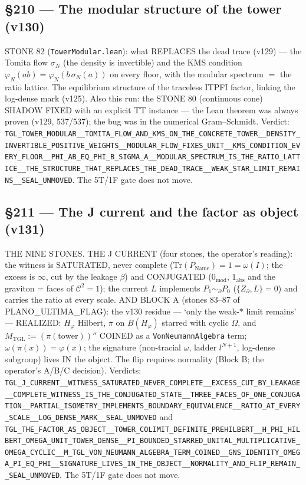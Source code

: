 \documentclass[11pt]{article}
\theoremstyle{definition}\newtheorem{deriv}{Derivation}
\begin{document}
\subsection*{\S210 --- The modular structure of the tower (v130)}STONE 82 (\texttt{TowerModular.lean}): what REPLACES the dead trace (v129) --- the Tomita flow $\sigma_N$ (the density is invertible) and the KMS condition $\varphi_N(ab)=\varphi_N(b\,\sigma_N(a))$ on every floor, with the modular spectrum $=$ the ratio lattice. The equilibrium structure of the traceless ITPFI factor, linking the log-dense mark (v125). Also this run: the STONE 80 (continuous cone) SHADOW FIXED with an explicit TT instance --- the Lean theorem was always proven (v129, 537/537); the bug was in the numerical Gram--Schmidt. Verdict: \texttt{TGL\_TOWER\_MODULAR\_\_TOMITA\_FLOW\_AND\_KMS\_ON\_THE\_CONCRETE\_TOWER\_\_DENSITY\_INVERTIBLE\_POSITIVE\_WEIGHTS\_\_MODULAR\_FLOW\_FIXES\_UNIT\_\_KMS\_CONDITION\_EVERY\_FLOOR\_\_PHI\_AB\_EQ\_PHI\_B\_SIGMA\_A\_\_MODULAR\_SPECTRUM\_IS\_THE\_RATIO\_LATTICE\_\_THE\_STRUCTURE\_THAT\_REPLACES\_THE\_DEAD\_TRACE\_\_WEAK\_STAR\_LIMIT\_REMAINS\_\_SEAL\_UNMOVED}. The 5T/1F gate does not move.

\subsection*{\S211 --- The J current and the factor as object (v131)}THE NINE STONES. THE J CURRENT (four stones, the operator's reading): the witness is SATURATED, never complete ($\mathrm{Tr}(P_{\mathrm{Name}})=1=\omega(I)$; the excess is $\infty$, cut by the leakage $\beta$) and CONJUGATED ($0_{\mathrm{mod}}$, $1_{\mathrm{abs}}$ and the graviton = faces of $\mathcal{C}^2=1$); the current $L$ implements $P_1\sim_\partial P_0$ ($\{Z_\partial,L\}=0$) and carries the ratio at every scale. AND BLOCK A (stones 83--87 of PLANO\_ULTIMA\_FLAG): the v130 residue --- ‘only the weak-$*$ limit remains’ --- REALIZED: $H_\varphi$ Hilbert, $\pi$ on $B(H_\varphi)$ starred with cyclic $\Omega$, and $M_{\mathrm{TGL}}:=(\pi(\mathrm{tower}))''$ COINED as a \texttt{VonNeumannAlgebra} term; $\omega(\pi(x))=\varphi(x)$; the signature (non-tracial $\omega$, ladder $l^{N+1}$, log-dense subgroup) lives IN the object. The flip requires normality (Block B; the operator's A/B/C decision). Verdicts: \texttt{TGL\_J\_CURRENT\_\_WITNESS\_SATURATED\_NEVER\_COMPLETE\_\_EXCESS\_CUT\_BY\_LEAKAGE\_\_COMPLETE\_WITNESS\_IS\_THE\_CONJUGATED\_STATE\_\_THREE\_FACES\_OF\_ONE\_CONJUGATION\_\_PARTIAL\_ISOMETRY\_IMPLEMENTS\_BOUNDARY\_EQUIVALENCE\_\_RATIO\_AT\_EVERY\_SCALE\_\_LOG\_DENSE\_MARK\_\_SEAL\_UNMOVED} and \texttt{TGL\_THE\_FACTOR\_AS\_OBJECT\_\_TOWER\_COLIMIT\_DEFINITE\_PREHILBERT\_\_H\_PHI\_HILBERT\_OMEGA\_UNIT\_TOWER\_DENSE\_\_PI\_BOUNDED\_STARRED\_UNITAL\_MULTIPLICATIVE\_OMEGA\_CYCLIC\_\_M\_TGL\_VON\_NEUMANN\_ALGEBRA\_TERM\_COINED\_\_GNS\_IDENTITY\_OMEGA\_PI\_EQ\_PHI\_\_SIGNATURE\_LIVES\_IN\_THE\_OBJECT\_\_NORMALITY\_AND\_FLIP\_REMAIN\_\_SEAL\_UNMOVED}. The 5T/1F gate does not move.
\end{document}
